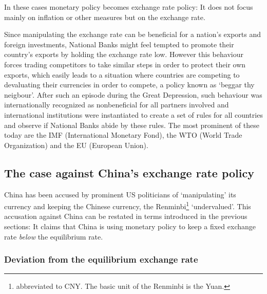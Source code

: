 \documentclass[11pt]{article}
\begin{document}
In these cases monetary policy becomes exchange rate policy: It does not focus mainly on inflation or other measures but on the exchange rate.

Since manipulating the 
exchange rate can be beneficial for a nation's exports and 
foreign investments, National Banks might feel tempted to promote their country's exports by holding the exchange rate low. However this behaviour forces trading competitors 
to take similar steps in order to protect their own exports, which 
easily leads to a situation where countries are competing to devaluating 
their currencies in order to compete, a policy known as `beggar thy neigbour'. After such an episode during the Great Depression, such behaviour was internationally recognized as nonbeneficial for all partners involved and international 
institutions were instantiated to create a set of rules for all countries and observe if National Banks abide by these rules. The most prominent of these today are the IMF (International 
Monetary Fond), the WTO (World Trade Organization) and the EU (European 
Union).



\subsection{The case against China's exchange rate policy}

China has been 
accused by prominent US politicians of `manipulating' its currency and 
keeping the Chinese currency, the Renminbi\footnote{abbreviated to CNY. 
The basic unit of the Renminbi is the Yuan.} `undervalued'. This accusation against China can be restated in terms introduced in the previous sections: It claims that China is using monetary policy to keep a 
fixed exchange rate \emph{below} the equilibrium rate. 

\subsubsection{Deviation from the equilibrium exchange rate}

\end{document}
